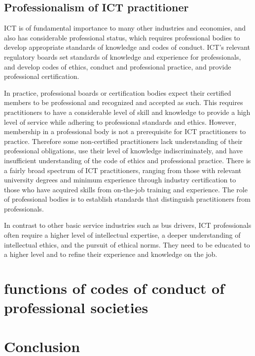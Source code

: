 \documentclass[a4paper,11pt]{article}
\begin{document}
\subsection{Professionalism of ICT practitioner}

ICT is of fundamental importance to many other industries and economies, and also has considerable professional status, which requires professional bodies to develop appropriate standards of knowledge and codes of conduct. ICT's relevant regulatory boards set standards of knowledge and experience for professionals, and develop codes of ethics, conduct and professional practice, and provide professional certification.

In practice, professional boards or certification bodies expect their certified members to be professional and recognized and accepted as such\cite{weckert2013professionalism}. This requires practitioners to have a considerable level of skill and knowledge to provide a high level of service while adhering to professional standards and ethics. However, membership in a professional body is not a prerequisite for ICT practitioners to practice. Therefore some non-certified practitioners lack understanding of their professional obligations, use their level of knowledge indiscriminately, and have insufficient understanding of the code of ethics and professional practice. There is a fairly broad spectrum of ICT practitioners, ranging from those with relevant university degrees and minimum experience through industry certification to those who have acquired skills from on-the-job training and experience. The role of professional bodies is to establish standards that distinguish practitioners from professionals.

In contrast to other basic service industries such as bus drivers, ICT professionals often require a higher level of intellectual expertise\cite{gleason2002ict}, a deeper understanding of intellectual ethics, and the pursuit of ethical norms. They need to be educated to a higher level and to refine their experience and knowledge on the job.

\section{functions of codes of conduct of professional societies}


\section{Conclusion}
\clearpage


\end{document}
